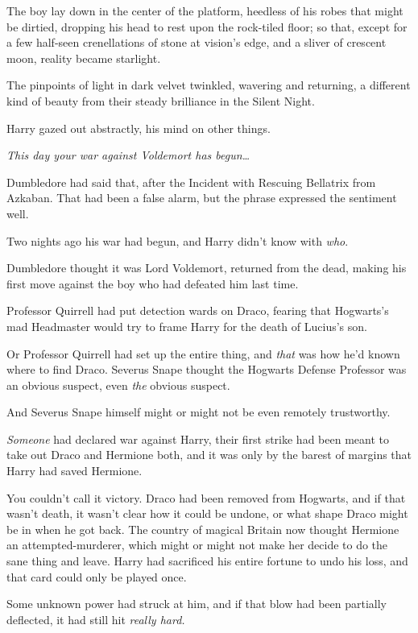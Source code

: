 The boy lay down in the center of the platform, heedless of his robes that
might be dirtied, dropping his head to rest upon the rock-tiled floor; so that,
except for a few half-seen crenellations of stone at vision's edge, and a
sliver of crescent moon, reality became starlight.

The pinpoints of light in dark velvet twinkled, wavering and returning, a
different kind of beauty from their steady brilliance in the Silent Night.

Harry gazed out abstractly, his mind on other things.

\emph{This day your war against Voldemort has begun{\ldots}}

Dumbledore had said that, after the Incident with Rescuing Bellatrix from
Azkaban. That had been a false alarm, but the phrase expressed the sentiment
well.

Two nights ago his war had begun, and Harry didn't know with \emph{who}.

Dumbledore thought it was Lord Voldemort, returned from the dead, making his
first move against the boy who had defeated him last time.

Professor Quirrell had put detection wards on Draco, fearing that Hogwarts's
mad Headmaster would try to frame Harry for the death of Lucius's son.

Or Professor Quirrell had set up the entire thing, and \emph{that} was how he'd
known where to find Draco. Severus Snape thought the Hogwarts Defense Professor
was an obvious suspect, even \emph{the} obvious suspect.

And Severus Snape himself might or might not be even remotely trustworthy.

\emph{Someone} had declared war against Harry, their first strike had been
meant to take out Draco and Hermione both, and it was only by the barest of
margins that Harry had saved Hermione.

You couldn't call it victory. Draco had been removed from Hogwarts, and if that
wasn't death, it wasn't clear how it could be undone, or what shape Draco might
be in when he got back. The country of magical Britain now thought Hermione an
attempted-murderer, which might or might not make her decide to do the sane
thing and leave. Harry had sacrificed his entire fortune to undo his loss, and
that card could only be played once.

Some unknown power had struck at him, and if that blow had been partially
deflected, it had still hit \emph{really hard.}

